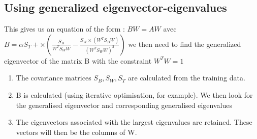 \subsection{Using generalized eigenvector-eigenvalues}

This gives us an equation of the form : $BW = AW$ avec $B = \alpha S_T + \times (\frac{S_B}{W^TS_WW} - \frac{S_W \times (W^TS_BW)}{(W^TS_WW)^2})$ we then need to find the generalized eigenvector of the matrix B with the constraint $W^TW = 1$

\begin{enumerate}
	\item The covariance matrices $S_B, S_W, S_T$ are calculated from the training data.
	\item B is calculated (using iterative optimisation, for example). We then look for the generalised eigenvector and corresponding generalised eigenvalues
	\item The eigenvectors associated with the largest eigenvalues are retained. These vectors will then be the columns of W.
\end{enumerate}
